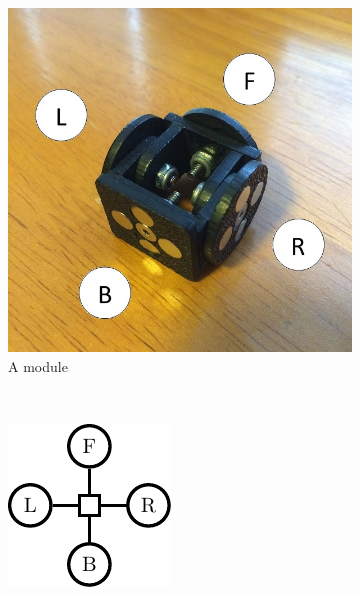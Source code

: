 \documentclass[conference]{IEEEtran}
\theoremstyle{definition}
\begin{document}
\begin{figure}
\begin{center}
        \begin{subfigure}[b]{0.4\columnwidth}
                \includegraphics[width=\textwidth]{images/smores.JPG}
                \caption{A module}
                \label{fig:smores_photo}
           \end{subfigure}
           ~
        \begin{subfigure}[b]{0.4\columnwidth}
                \includegraphics[width=\textwidth]{images/tikz/smores.pdf}

\end{subfigure}
\end{center}
\end{figure}
\end{document}
